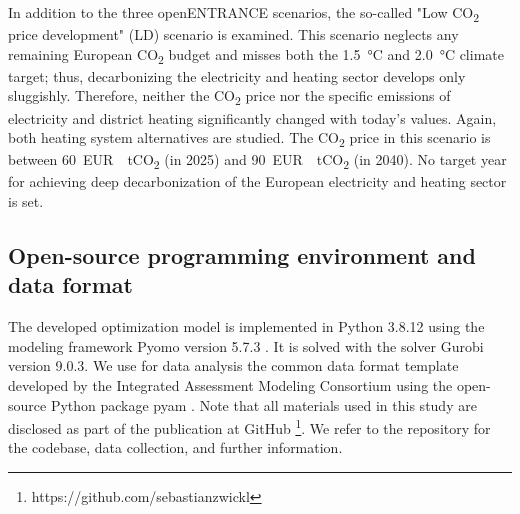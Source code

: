 In addition to the three openENTRANCE scenarios, the so-called "Low CO\textsubscript{2} price development" (LD) scenario is examined. This scenario neglects any remaining European CO\textsubscript{2} budget and misses both the  \SI{1.5}{\degreeCelsius} and \SI{2.0}{\degreeCelsius} climate target; thus, decarbonizing the electricity and heating sector develops only sluggishly. Therefore, neither the CO\textsubscript{2} price nor the specific emissions of electricity and district heating significantly changed with today's values. Again, both heating system alternatives are studied. The CO\textsubscript{2} price in this scenario is between \SI{60}{EUR \per tCO_{2}} (in 2025) and \SI{90}{EUR \per tCO_{2}} (in 2040). No target year for achieving deep decarbonization of the European electricity and heating sector is set. 

%

\subsection{Open-source programming environment and data format}\label{met:os}
The developed optimization model is implemented in Python 3.8.12 using the modeling framework Pyomo version 5.7.3 \cite{hart2017optimization}. It is solved with the solver Gurobi version 9.0.3. We use for data analysis the common data format template developed by the Integrated Assessment Modeling Consortium using the open-source Python package pyam \cite{huppmann2021pyam}. Note that all materials used in this study are disclosed as part of the publication at GitHub \footnote{https://github.com/sebastianzwickl}. We refer to the repository for the codebase, data collection, and further information. 